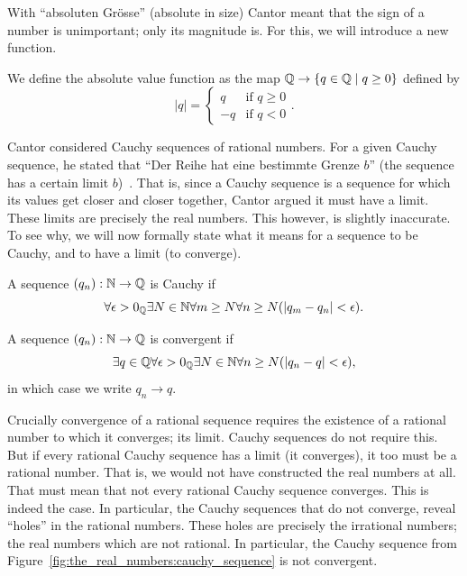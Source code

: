 \documentclass[../main.tex]{subfiles}
\begin{document}
With ``\textgerman{absoluten Grösse}'' (absolute in size) Cantor meant that the sign of a number is unimportant; only its magnitude is. For this, we will introduce a new function.
\begin{definition}\label{dfn:the_real_numbers:absolute_value_function}
    We define the absolute value function as the map $\mathbb{Q}\to\{q\in\mathbb{Q}\mid q\geq0\}$ defined by
    \begin{equation*}
        \vert q\vert=
        \begin{cases}
            q & \text{if }q\geq0 \\
            -q & \text{if }q<0
        \end{cases}.
    \end{equation*}
\end{definition}
Cantor considered Cauchy sequences of rational numbers. For a given Cauchy sequence, he stated that ``\textgerman{Der Reihe hat eine bestimmte Grenze $b$}'' (the sequence has a certain limit $b$)~\cite{Cantor1872}. That is, since a Cauchy sequence is a sequence for which its values get closer and closer together, Cantor argued it must have a limit. These limits are precisely the real numbers. This however, is slightly inaccurate. To see why, we will now formally state what it means for a sequence to be Cauchy, and to have a limit (to converge).
\begin{definition}
    A sequence $(q_n):\mathbb{N}\to\mathbb{Q}$ is Cauchy if
    \begin{equation*}
        \forall\epsilon>0_{\mathbb{Q}}\exists N\in\mathbb{N}\forall m\geq N\forall n\geq N(\vert q_m-q_n\vert<\epsilon).
    \end{equation*}
\end{definition}
\begin{definition}
    A sequence $(q_n):\mathbb{N}\to\mathbb{Q}$ is convergent if
    \begin{equation*}
        \exists q\in\mathbb{Q}\forall\epsilon>0_{\mathbb{Q}}\exists N\in\mathbb{N}\forall n\geq N(\vert q_n-q\vert<\epsilon),
    \end{equation*}
    in which case we write $q_n\to q$.
\end{definition}
Crucially convergence of a rational sequence requires the existence of a rational number to which it converges; its limit. Cauchy sequences do not require this. But if every rational Cauchy sequence has a limit (it converges), it too must be a rational number. That is, we would not have constructed the real numbers at all. That must mean that not every rational Cauchy sequence converges. This is indeed the case. In particular, the Cauchy sequences that do not converge, reveal ``holes'' in the rational numbers. These holes are precisely the irrational numbers; the real numbers which are not rational. In particular, the Cauchy sequence from Figure~\ref{fig:the_real_numbers:cauchy_sequence} is not convergent.
\end{document}
